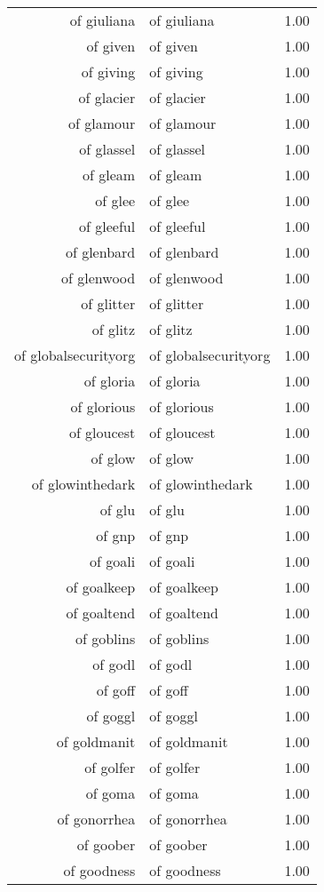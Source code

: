 \begin{table}[ht]
\begin{tabular}{rlr}
  of giuliana & of giuliana & 1.00 \\ 
  of given & of given & 1.00 \\ 
  of giving & of giving & 1.00 \\ 
  of glacier & of glacier & 1.00 \\ 
  of glamour & of glamour & 1.00 \\ 
  of glassel & of glassel & 1.00 \\ 
  of gleam & of gleam & 1.00 \\ 
  of glee & of glee & 1.00 \\ 
  of gleeful & of gleeful & 1.00 \\ 
  of glenbard & of glenbard & 1.00 \\ 
  of glenwood & of glenwood & 1.00 \\ 
  of glitter & of glitter & 1.00 \\ 
  of glitz & of glitz & 1.00 \\ 
  of globalsecurityorg & of globalsecurityorg & 1.00 \\ 
  of gloria & of gloria & 1.00 \\ 
  of glorious & of glorious & 1.00 \\ 
  of gloucest & of gloucest & 1.00 \\ 
  of glow & of glow & 1.00 \\ 
  of glowinthedark & of glowinthedark & 1.00 \\ 
  of glu & of glu & 1.00 \\ 
  of gnp & of gnp & 1.00 \\ 
  of goali & of goali & 1.00 \\ 
  of goalkeep & of goalkeep & 1.00 \\ 
  of goaltend & of goaltend & 1.00 \\ 
  of goblins & of goblins & 1.00 \\ 
  of godl & of godl & 1.00 \\ 
  of goff & of goff & 1.00 \\ 
  of goggl & of goggl & 1.00 \\ 
  of goldmanit & of goldmanit & 1.00 \\ 
  of golfer & of golfer & 1.00 \\ 
  of goma & of goma & 1.00 \\ 
  of gonorrhea & of gonorrhea & 1.00 \\ 
  of goober & of goober & 1.00 \\ 
  of goodness & of goodness & 1.00 \\ 

\end{tabular}
\end{table}
